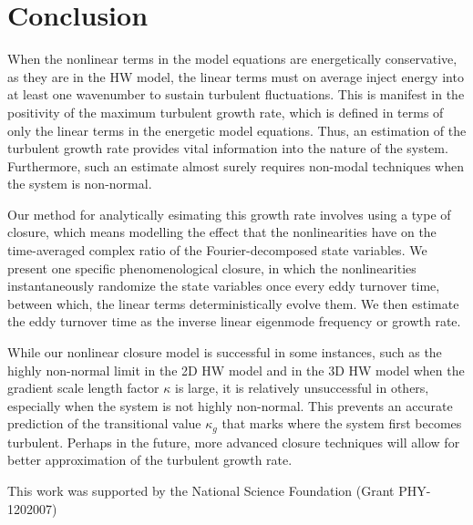\documentclass[twocolumn,showkeys,superscriptaddress]{revtex4}
\begin{document}
\section{Conclusion}

When the nonlinear terms in the model equations are energetically conservative, as they are in the HW model, the linear terms must on average inject energy into at least one wavenumber to sustain turbulent fluctuations.
This is manifest in the positivity of the maximum turbulent growth rate, which is defined in terms of only the linear terms in the energetic model equations. Thus, an estimation of the turbulent growth rate provides vital
information into the nature of the system. Furthermore, such an estimate almost surely requires non-modal techniques when the system is non-normal. 

Our method for analytically esimating this growth rate involves using a type of closure, which means modelling the effect that the nonlinearities have
on the time-averaged complex ratio of the Fourier-decomposed state variables. 
We present one specific phenomenological closure, in which the nonlinearities instantaneously randomize the state variables once every eddy turnover time, between
which, the linear terms deterministically evolve them. We then estimate the eddy turnover time as the inverse linear eigenmode frequency or growth rate.

While our nonlinear closure model is successful in some instances, such as the highly non-normal limit in the 2D HW model and in the 3D HW model when the gradient scale length factor $\kappa$ is large, it is relatively unsuccessful
in others, especially when the system is not highly non-normal. This prevents an accurate prediction of the transitional value $\kappa_g$ that marks where the system first becomes turbulent.
Perhaps in the future, more advanced closure techniques will allow for better approximation of the turbulent growth rate.

\begin{acknowledgments}
This work was supported by the National Science Foundation (Grant PHY-1202007)
\end{acknowledgments}


%

\end{document}
